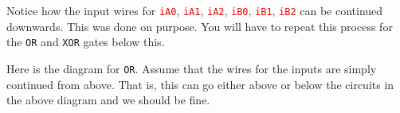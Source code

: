 \documentclass{article}
\newcommand{\varin}[1]{\textcolor{red}{\texttt{#1}}}
\begin{document}
Notice how the input wires for \varin{iA0}, \varin{iA1}, \varin{iA2}, \varin{iB0}, \varin{iB1}, \varin{iB2} can be continued downwards. This was done on purpose. You will have to repeat this process for the \texttt{OR} and \texttt{XOR} gates below this.

Here is the diagram for \texttt{OR}. Assume that the wires for the inputs are simply continued from above. That is, this can go either above or below the circuits in the above diagram and we should be fine.




\begin{tikzpicture}[x=0.75pt,y=0.75pt,yscale=-1,xscale=1]


\end{tikzpicture}
\end{document}

